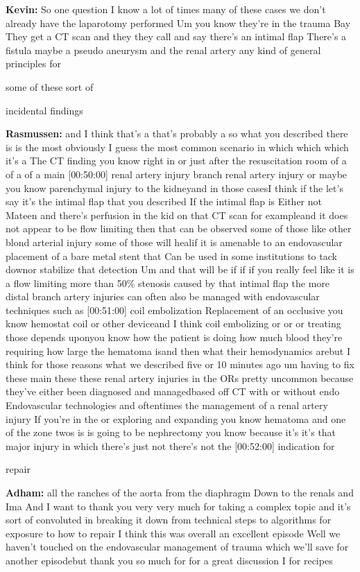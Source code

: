 \documentclass[
]{book}
\begin{document}
\textbf{Kevin:} So one question I know a lot of times many of these cases we
don't already have the laparotomy performed Um you know they're in the
trauma Bay They get a CT scan and they they call and say there's an
intimal flap There's a fistula maybe a pseudo aneurysm and the renal
artery any kind of general principles for

some of these sort of

incidental findings

\textbf{Rasmussen:} and I think that's a that's probably a so what you
described there is is the most obviously I guess the most common
scenario in which which which it's a The CT finding you know right in or
just after the resuscitation room of a of a of a main {[}00:50:00{]} renal
artery injury branch renal artery injury or maybe you know parenchymal
injury to the kidneyand in those casesI think if the let's say it's the
intimal flap that you described If the intimal flap is Either not Mateen
and there's perfusion in the kid on that CT scan for exampleand it does
not appear to be flow limiting then that can be observed some of those
like other blond arterial injury some of those will healif it is
amenable to an endovascular placement of a bare metal stent that Can be
used in some institutions to tack downor stabilize that detection Um and
that will be if if if you really feel like it is a flow limiting more
than 50\% stenosis caused by that intimal flap the more distal branch
artery injuries can often also be managed with endovascular techniques
such as {[}00:51:00{]} coil embolization Replacement of an occlusive you
know hemostat coil or other deviceand I think coil embolizing or or or
treating those depends uponyou know how the patient is doing how much
blood they're requiring how large the hematoma isand then what their
hemodynamics arebut I think for those reasons what we described five or
10 minutes ago um having to fix these main these these renal artery
injuries in the ORs pretty uncommon because they've either been
diagnosed and managedbased off CT with or without endo Endovascular
technologies and oftentimes the management of a renal artery injury If
you're in the or exploring and expanding you know hematoma and one of
the zone twos is is going to be nephrectomy you know because it's it's
that major injury in which there's just not there's not the {[}00:52:00{]}
indication for

repair

\textbf{Adham:} all the ranches of the aorta from the diaphragm Down to the
renals and Ima And I want to thank you very very much for taking a
complex topic and it's sort of convoluted in breaking it down from
technical steps to algorithms for exposure to how to repair I think this
was overall an excellent episode Well we haven't touched on the
endovascular management of trauma which we'll save for another
episodebut thank you so much for for a great discussion I for recipes
\end{document}
